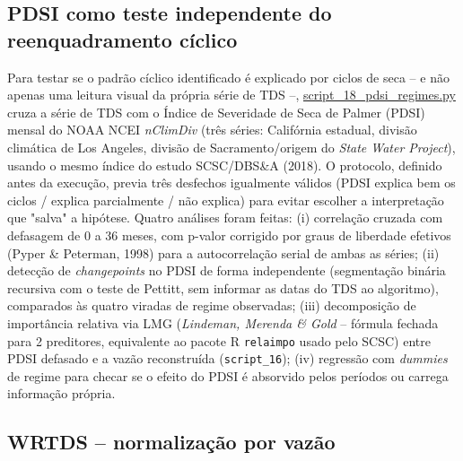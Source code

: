 \subsection{PDSI como teste independente do reenquadramento cíclico}

Para testar se o padrão cíclico identificado é explicado por ciclos de seca -- e não apenas uma leitura visual da própria série de TDS --, \url{script_18_pdsi_regimes.py} cruza a série de TDS com o Índice de Severidade de Seca de Palmer (PDSI) mensal do NOAA NCEI \textit{nClimDiv} (três séries: Califórnia estadual, divisão climática de Los Angeles, divisão de Sacramento/origem do \textit{State Water Project}), usando o mesmo índice do estudo SCSC/DBS\&A (2018). O protocolo, definido antes da execução, previa três desfechos igualmente válidos (PDSI explica bem os ciclos / explica parcialmente / não explica) para evitar escolher a interpretação que "salva" a hipótese. Quatro análises foram feitas: (i) correlação cruzada com defasagem de 0 a 36 meses, com p-valor corrigido por graus de liberdade efetivos (Pyper \& Peterman, 1998) para a autocorrelação serial de ambas as séries; (ii) detecção de \textit{changepoints} no PDSI de forma independente (segmentação binária recursiva com o teste de Pettitt, sem informar as datas do TDS ao algoritmo), comparados às quatro viradas de regime observadas; (iii) decomposição de importância relativa via LMG (\textit{Lindeman, Merenda \& Gold} -- fórmula fechada para 2 preditores, equivalente ao pacote R \texttt{relaimpo} usado pelo SCSC) entre PDSI defasado e a vazão reconstruída (\texttt{script\_16}); (iv) regressão com \textit{dummies} de regime para checar se o efeito do PDSI é absorvido pelos períodos ou carrega informação própria.

\subsection{WRTDS -- normalização por vazão}

